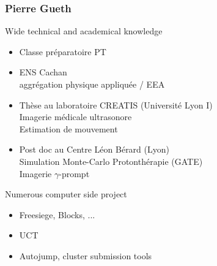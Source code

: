 \documentclass{beamer}
\begin{document}
\begin{frame}
\frametitle{Pierre Gueth}
\begin{block}{Wide technical and academical knowledge}
\begin{itemize}
\item Classe préparatoire PT
\item ENS Cachan \\ aggrégation physique appliquée / EEA
\item Thèse au laboratoire CREATIS (Université Lyon I) \\ Imagerie médicale ultrasonore \\ Estimation de mouvement
\item Post doc au Centre Léon Bérard (Lyon) \\ Simulation Monte-Carlo Protonthérapie (GATE) \\ Imagerie $\gamma$-prompt
\end{itemize}
\end{block}
\begin{block}{Numerous computer side project}
\begin{itemize}
\item Freesiege, Blocks, ...
\item UCT
\item Autojump, cluster submission tools
\end{itemize}
\end{block}
\end{frame}
\end{document}
